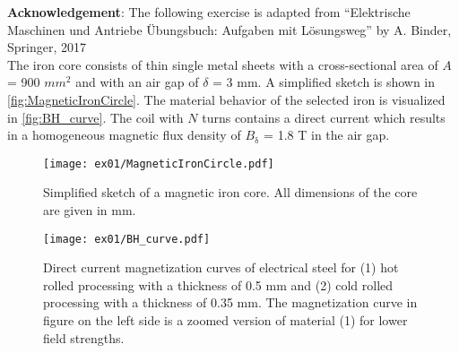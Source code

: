 

\normalsize{\textbf{Acknowledgement}: The following exercise is adapted from ``Elektrische Maschinen und Antriebe Übungsbuch: Aufgaben mit Lösungsweg'' by A. Binder, Springer, 2017}\\




The iron core consists of thin single metal sheets with a cross-sectional area of $A$ = 900 $\si{mm}^2$ and with an air gap of $\delta$ = 3 mm. A simplified sketch is shown in \autoref{fig:MagneticIronCircle}. The material behavior of the selected iron is visualized in \autoref{fig:BH_curve}. The coil with $N$ turns contains a direct current which results in a homogeneous magnetic flux density of $B_{\mathrm{\delta}}$ = 1.8 T in the air gap.


\begin{figure}[htb]
    \centering
    \texttt{[image: ex01/MagneticIronCircle.pdf]}
    \caption{Simplified sketch of a magnetic iron core. All dimensions of the core are given in mm.}
    \label{fig:MagneticIronCircle}
\end{figure}

\begin{figure}[htb]
    \centering
    \texttt{[image: ex01/BH\_curve.pdf]}
    \caption{Direct current magnetization curves of electrical steel for (1) hot rolled processing with a thickness of 0.5 mm and (2) cold rolled processing with a thickness of 0.35 mm. The magnetization curve in figure on the left side is a zoomed version of material (1) for lower field strengths.}
    \label{fig:BH_curve}
\end{figure}



